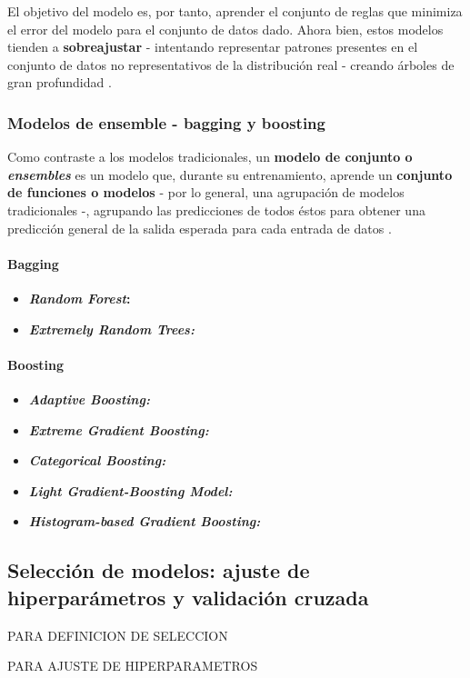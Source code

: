 El objetivo del modelo es, por tanto, aprender el conjunto de reglas que minimiza el error del modelo para el conjunto de datos dado. Ahora bien, estos modelos tienden a \textbf{sobreajustar} - intentando representar patrones presentes en el conjunto de datos no representativos de la distribución real - creando árboles de gran profundidad \cite{aima}.


\subsubsection{Modelos de ensemble - bagging y boosting}

Como contraste a los modelos tradicionales, un \textbf{modelo de conjunto o \textit{ensembles}} es un modelo que, durante su entrenamiento, aprende un \textbf{conjunto de funciones o modelos} - por lo general, una agrupación de modelos tradicionales -, agrupando las predicciones de todos éstos para obtener una predicción general de la salida esperada para cada entrada de datos \cite{aima}.

\paragraph{Bagging}

\begin{itemize}
	\item \textbf{\textit{Random Forest}:}
	\item \textbf{\textit{Extremely Random Trees:}}
\end{itemize}

\paragraph{Boosting}

\begin{itemize}
	\item \textbf{\textit{Adaptive Boosting:}}
\end{itemize}

\begin{itemize}
	\item \textbf{\textit{Extreme Gradient Boosting:}}
	\item \textbf{\textit{Categorical Boosting:}}
	\item \textbf{\textit{Light Gradient-Boosting Model:}}
	\item \textbf{\textit{Histogram-based Gradient Boosting:}}
\end{itemize}


\subsection{Selección de modelos: ajuste de hiperparámetros y validación cruzada}

\cite{mlprobabilistic} PARA DEFINICION DE SELECCION

\cite{Goodfellow-et-al-2016} PARA AJUSTE DE HIPERPARAMETROS
